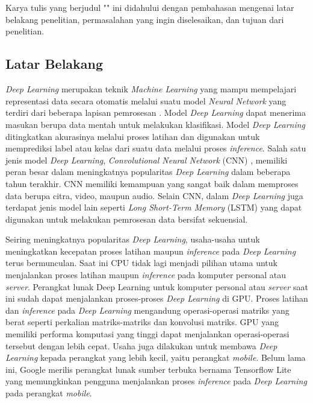 \chapter{\babSatu}
Karya tulis yang berjudul "\judul" ini didahului dengan pembahasan mengenai latar belakang penelitian, permasalahan yang ingin diselesaikan, dan tujuan dari penelitian.

\section{Latar Belakang}
\textit{Deep Learning} merupakan teknik \textit{Machine Learning} yang mampu mempelajari representasi data secara otomatis melalui suatu model \textit{Neural Network} yang terdiri dari beberapa lapisan pemrosesan \cite{deeplearning}. Model \textit{Deep Learning} dapat menerima masukan berupa data mentah untuk melakukan klasifikasi. Model \textit{Deep Learning} ditingkatkan akurasinya melalui proses latihan dan digunakan untuk memprediksi label atau kelas dari suatu data melalui proses \textit{inference}. Salah satu jenis model \textit{Deep Learning}, \textit{Convolutional Neural Network} (CNN) \cite{cnnori}, memiliki peran besar dalam meningkatnya popularitas \textit{Deep Learning} dalam beberapa tahun terakhir. CNN memiliki kemampuan yang sangat baik dalam memproses data berupa citra, video, maupun audio. Selain CNN, dalam \textit{Deep Learning} juga terdapat jenis model lain seperti \textit{Long Short-Term Memory} (LSTM) \cite{lstm} yang dapat digunakan untuk melakukan pemrosesan data bersifat sekuensial.

Seiring meningkatnya popularitas \textit{Deep Learning}, usaha-usaha untuk meningkatkan kecepatan proses latihan maupun \textit{inference} pada \textit{Deep Learning} terus bermunculan. Saat ini CPU tidak lagi menjadi pilihan utama untuk menjalankan proses latihan maupun \textit{inference} pada komputer personal atau \textit{server}. Perangkat lunak Deep Learning untuk komputer personal atau \textit{server} saat ini sudah dapat menjalankan proses-proses \textit{Deep Learning} di GPU. Proses latihan dan \textit{inference} pada \textit{Deep Learning} mengandung operasi-operasi matriks yang berat seperti perkalian matriks-matriks dan konvolusi matriks. GPU yang memiliki performa komputasi yang tinggi dapat menjalankan operasi-operasi tersebut dengan lebih cepat. Usaha juga dilakukan untuk membawa \textit{Deep Learning} kepada perangkat yang lebih kecil, yaitu perangkat \textit{mobile}. Belum lama ini, Google merilis perangkat lunak sumber terbuka bernama Tensorflow Lite \cite{tflite} yang memungkinkan pengguna menjalankan proses \textit{inference} pada \textit{Deep Learning} pada perangkat \textit{mobile}.

